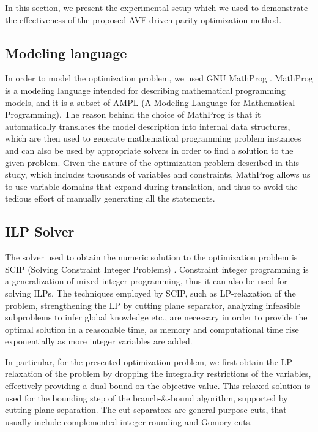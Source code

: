 \documentclass[12pt]{yalephd}
\begin{document}
In this section, we present the experimental setup which we used to demonstrate the effectiveness of the proposed AVF-driven parity optimization method.

\subsection{Modeling language}

In order to model the optimization problem, we used GNU MathProg \cite{makhorin2000modeling}. MathProg is a modeling language intended for describing mathematical programming models, and it is a subset of AMPL (A Modeling Language for Mathematical Programming). The reason behind the choice of MathProg is that it automatically translates the model description into internal data structures, which are then used to generate mathematical programming problem instances and can also be used by appropriate solvers in order to find a solution to the given problem. Given the nature of the optimization problem described in this study, which includes thousands of variables and constraints, MathProg allows us to use variable domains that expand during translation, and thus to avoid the tedious effort of manually generating all the statements.


\subsection{ILP Solver}

The solver used to obtain the numeric solution to the optimization problem is SCIP (Solving Constraint Integer Problems) \cite{Achterberg2009}. Constraint integer programming is a generalization of mixed-integer programming, thus it can also be used for solving ILPs. The techniques employed by SCIP, such as LP-relaxation of the problem, strengthening the LP by cutting plane separator, analyzing infeasible subproblems to infer global knowledge etc., are necessary in order to provide the optimal solution in a reasonable time, as memory and computational time rise exponentially as more integer variables are added.

In particular, for the presented optimization problem, we first obtain the LP-relaxation of the problem by dropping the integrality restrictions of the variables, effectively providing a dual bound on the objective value. This relaxed solution is used for the bounding step of the branch-\&-bound algorithm, supported by cutting plane separation. The cut separators are general purpose cuts, that usually include complemented integer rounding and Gomory cuts.
\end{document}

